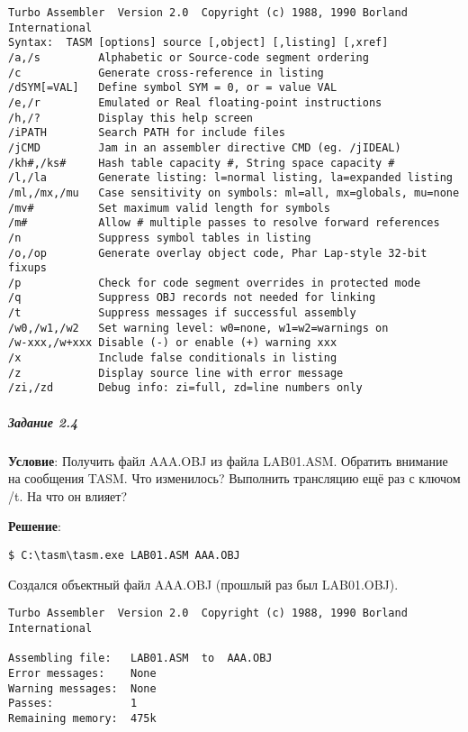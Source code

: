 \begin{lstlisting}[language=Out]
Turbo Assembler  Version 2.0  Copyright (c) 1988, 1990 Borland International
Syntax:  TASM [options] source [,object] [,listing] [,xref]
/a,/s         Alphabetic or Source-code segment ordering
/c            Generate cross-reference in listing
/dSYM[=VAL]   Define symbol SYM = 0, or = value VAL
/e,/r         Emulated or Real floating-point instructions
/h,/?         Display this help screen
/iPATH        Search PATH for include files
/jCMD         Jam in an assembler directive CMD (eg. /jIDEAL)
/kh#,/ks#     Hash table capacity #, String space capacity #
/l,/la        Generate listing: l=normal listing, la=expanded listing
/ml,/mx,/mu   Case sensitivity on symbols: ml=all, mx=globals, mu=none
/mv#          Set maximum valid length for symbols
/m#           Allow # multiple passes to resolve forward references
/n            Suppress symbol tables in listing
/o,/op        Generate overlay object code, Phar Lap-style 32-bit fixups
/p            Check for code segment overrides in protected mode
/q            Suppress OBJ records not needed for linking
/t            Suppress messages if successful assembly
/w0,/w1,/w2   Set warning level: w0=none, w1=w2=warnings on
/w-xxx,/w+xxx Disable (-) or enable (+) warning xxx
/x            Include false conditionals in listing
/z            Display source line with error message
/zi,/zd       Debug info: zi=full, zd=line numbers only
\end{lstlisting}



\subparagraph{Задание 2.4}

\textbf{Условие}: Получить файл AAA.OBJ из файла LAB01.ASM. Обратить внимание на сообщения TASM. Что изменилось? Выполнить трансляцию ещё раз с ключом /t. На что он влияет?

\textbf{Решение}:

\begin{lstlisting}[language=Terminal]
$ C:\tasm\tasm.exe LAB01.ASM AAA.OBJ
\end{lstlisting}
   
Создался объектный файл AAA.OBJ (прошлый раз был LAB01.OBJ).

\begin{lstlisting}[language=Out]
Turbo Assembler  Version 2.0  Copyright (c) 1988, 1990 Borland International

Assembling file:   LAB01.ASM  to  AAA.OBJ
Error messages:    None
Warning messages:  None
Passes:            1
Remaining memory:  475k
\end{lstlisting}



